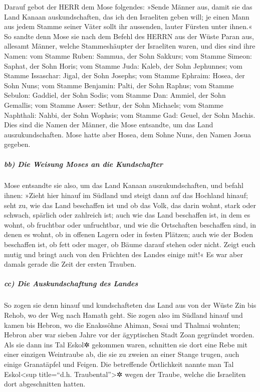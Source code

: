 Darauf gebot der HERR dem Mose folgendes:
»Sende Männer aus, damit sie das Land Kanaan
auskundschaften, das ich den Israeliten geben will; je einen Mann aus
jedem Stamme seiner Väter sollt ihr aussenden, lauter Fürsten unter
ihnen.« So sandte denn Mose sie nach dem Befehl des HERRN
aus der Wüste Paran aus, allesamt Männer, welche Stammeshäupter der
Israeliten waren, und dies sind ihre Namen: vom Stamme
Ruben: Sammua, der Sohn Sakkurs; vom Stamme Simeon:
Saphat, der Sohn Horis; vom Stamme Juda: Kaleb, der Sohn
Jephunnes; vom Stamme Issaschar: Jigal, der Sohn Josephs;
vom Stamme Ephraim: Hosea, der Sohn Nuns;
vom Stamme Benjamin: Palti, der Sohn Raphus;
vom Stamme Sebulon: Gaddiel, der Sohn Sodis;
 vom Stamme Dan: Ammiel, der Sohn
Gemallis; vom Stamme Asser: Sethur, der Sohn Michaels;
vom Stamme Naphthali: Nahbi, der Sohn Wophsis;
vom Stamme Gad: Geuel, der Sohn Machis.
Dies sind die Namen der Männer, die Mose entsandte, um
das Land auszukundschaften. Mose hatte aber Hosea, dem Sohne Nuns, den
Namen Josua gegeben.

\hypertarget{bb-die-weisung-moses-an-die-kundschafter}{%
\subparagraph{bb) Die Weisung Moses an die
Kundschafter}\label{bb-die-weisung-moses-an-die-kundschafter}}

Mose entsandte sie also, um das Land Kanaan
auszukundschaften, und befahl ihnen: »Zieht hier hinauf im Südland und
steigt dann auf das Hochland hinauf; seht zu, wie das
Land beschaffen ist und ob das Volk, das darin wohnt, stark oder
schwach, spärlich oder zahlreich ist; auch wie das Land
beschaffen ist, in dem es wohnt, ob fruchtbar oder unfruchtbar, und wie
die Ortschaften beschaffen sind, in denen es wohnt, ob in offenen Lagern
oder in festen Plätzen; auch wie der Boden beschaffen
ist, ob fett oder mager, ob Bäume darauf stehen oder nicht. Zeigt euch
mutig und bringt auch von den Früchten des Landes einige mit!« Es war
aber damals gerade die Zeit der ersten Trauben.

\hypertarget{cc-die-auskundschaftung-des-landes}{%
\subparagraph{cc) Die Auskundschaftung des
Landes}\label{cc-die-auskundschaftung-des-landes}}

So zogen sie denn hinauf und kundschafteten das Land aus
von der Wüste Zin bis Rehob, wo der Weg nach Hamath geht.
Sie zogen also im Südland hinauf und kamen bis Hebron, wo
die Enakssöhne Ahiman, Sesai und Thalmai wohnten; Hebron aber war sieben
Jahre vor der ägyptischen Stadt Zoan gegründet worden.
Als sie dann ins Tal Eskol✲ gekommen waren, schnitten sie
dort eine Rebe mit einer einzigen Weintraube ab, die sie zu zweien an
einer Stange trugen, auch einige Granatäpfel und Feigen.
Die betreffende Örtlichkeit nannte man Tal
Eskol\textless sup title=``d.h. Traubental''\textgreater✲ wegen der
Traube, welche die Israeliten dort abgeschnitten hatten.

